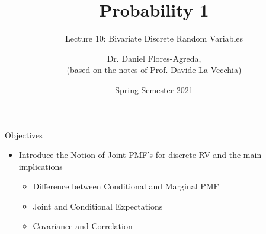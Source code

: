 \documentclass[notes=show,handout]{beamer}\usepackage[]{graphicx}\usepackage[]{color}
\begin{document}
\title[S110015]{Probability 1}
\subtitle{Lecture 10: Bivariate Discrete Random Variables}
\author[Flores-Agreda, La Vecchia]{Dr. Daniel Flores-Agreda, \\[0.5em] \tiny{(based on the notes of Prof. Davide La Vecchia)}}
\date{Spring Semester 2021}


\begin{frame}
  \titlepage
\end{frame}

\begin{frame}{Objectives}
  \begin{itemize}
  \item Introduce the Notion of Joint PMF's for discrete RV and the main implications \bigskip
  \begin{itemize}
  \item Difference between Conditional and Marginal PMF \bigskip
  \item Joint and Conditional Expectations \bigskip
  \item Covariance and Correlation \bigskip
  \end{itemize}
  \end{itemize}
\end{frame}
\end{document}
